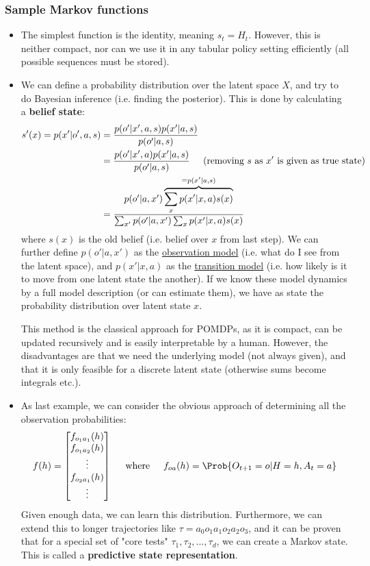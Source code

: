 \subsubsection{Sample Markov functions}
\begin{itemize}
	\item The simplest function is the identity, meaning $s_t=H_t$. However, this is neither compact, nor can we use it in any tabular policy setting efficiently (all possible sequences must be stored).
	\item We can define a probability distribution over the latent space $X$, and try to do Bayesian inference (i.e. finding the posterior). This is done by calculating a \textbf{belief state}:
	\begin{equation*}
		\begin{split}
			s'(x)=p(x'|o',a,s)& =\frac{p(o'|x',a,s)p(x'|a,s)}{p(o'|a,s)}\\
			& = \frac{p(o'|x',a)p(x'|a,s)}{p(o'|a,s)}\hspace{5mm}\text{(removing $s$ as $x'$ is given as true state)}\\
			& = \frac{p(o'|a,x')\overbrace{\sum_x p(x'|x,a)s(x)}^{=p(x'|a,s)}}{\sum_{x'}p(o'|a,x')\sum_x p(x'|x,a)s(x)}
		\end{split}
	\end{equation*}
	where $s(x)$ is the old belief (i.e. belief over $x$ from last step). We can further define $p(o'|a,x')$ as the \underline{observation model} (i.e. what do I see from the latent space), and $p(x'|x,a)$ as the \underline{transition model} (i.e. how likely is it to move from one latent state the another). If we know these model dynamics by a full model description (or can estimate them), we have as state the probability distribution over latent state $x$.
	
	This method is the classical approach for POMDPs, as it is compact, can be updated recursively and is easily interpretable by a human. However, the disadvantages are that we need the underlying model (not always given), and that it is only feasible for a discrete latent state (otherwise sums become integrals etc.).
	\item As last example, we can consider the obvious approach of determining all the observation probabilities:
	$$f(h)=\begin{bmatrix}
	f_{o_1a_1}(h)\\ f_{o_1a_2}(h)\\\vdots\\f_{o_2a_1}(h)\\\vdots\\
	\end{bmatrix}\hspace{5mm}\text{where}\hspace{5mm}f_{oa}(h)=\Prob{O_{t+1}=o|H=h,A_t=a}$$
	Given enough data, we can learn this distribution. Furthermore, we can extend this to longer trajectories like $\tau=a_0o_1a_1o_2a_2o_3$, and it can be proven that for a special set of "core tests" $\tau_1,\tau_2,...,\tau_d$, we can create a Markov state. This is called a \textbf{predictive state representation}.
	

\end{itemize}
